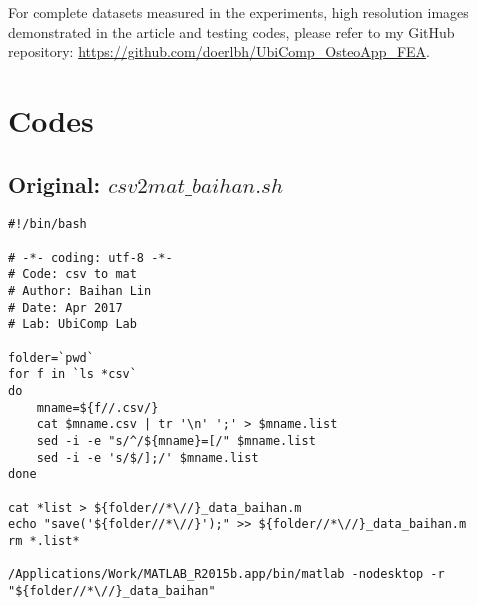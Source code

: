 \documentclass{sigchi}
\begin{document}
For complete datasets measured in the experiments, high resolution images demonstrated in the article and testing codes, please refer to my GitHub repository: \url{https://github.com/doerlbh/UbiComp_OsteoApp_FEA}.


\section{Codes}

\subsection{Original: $csv2mat\_baihan.sh$}\label{ss:csv2mat}
\begin{lstlisting}
#!/bin/bash

# -*- coding: utf-8 -*-
# Code: csv to mat
# Author: Baihan Lin
# Date: Apr 2017
# Lab: UbiComp Lab

folder=`pwd`
for f in `ls *csv`
do
    mname=${f//.csv/}
    cat $mname.csv | tr '\n' ';' > $mname.list 
    sed -i -e "s/^/${mname}=[/" $mname.list
    sed -i -e 's/$/];/' $mname.list
done

cat *list > ${folder//*\//}_data_baihan.m
echo "save('${folder//*\//}');" >> ${folder//*\//}_data_baihan.m
rm *.list*

/Applications/Work/MATLAB_R2015b.app/bin/matlab -nodesktop -r "${folder//*\//}_data_baihan"
\end{lstlisting}
\end{document}
